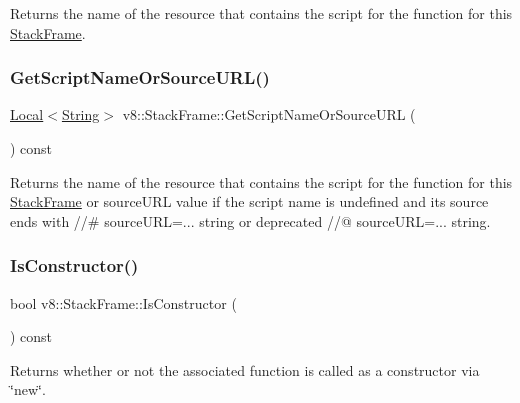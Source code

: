 Returns the name of the resource that contains the script for the function for this \mbox{\hyperlink{classv8_1_1StackFrame}{Stack\+Frame}}. \mbox{\label{classv8_1_1StackFrame_a4fbd286090b13661b3db148e0a3779b5}} 
\subsubsection{\texorpdfstring{Get\+Script\+Name\+Or\+Source\+U\+R\+L()}{GetScriptNameOrSourceURL()}}
{\footnotesize\ttfamily \mbox{\hyperlink{classv8_1_1Local}{Local}}$<$\mbox{\hyperlink{classv8_1_1String}{String}}$>$ v8\+::\+Stack\+Frame\+::\+Get\+Script\+Name\+Or\+Source\+U\+RL (\begin{DoxyParamCaption}{ }\end{DoxyParamCaption}) const}

Returns the name of the resource that contains the script for the function for this \mbox{\hyperlink{classv8_1_1StackFrame}{Stack\+Frame}} or source\+U\+RL value if the script name is undefined and its source ends with //\# source\+U\+RL=... string or deprecated //@ source\+U\+RL=... string. \mbox{\label{classv8_1_1StackFrame_a8f37df38214b6dc10655fc50f0341eb8}} 
\subsubsection{\texorpdfstring{Is\+Constructor()}{IsConstructor()}}
{\footnotesize\ttfamily bool v8\+::\+Stack\+Frame\+::\+Is\+Constructor (\begin{DoxyParamCaption}{ }\end{DoxyParamCaption}) const}

Returns whether or not the associated function is called as a constructor via \char`\"{}new\char`\"{}. \mbox{\label{classv8_1_1StackFrame_aa07e67a6a00adcd0f5c8c4ba7a82e54a}} 
